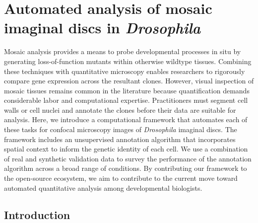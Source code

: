 
\graphicspath{ {./figures/} }


\chapter{Automated analysis of mosaic imaginal discs in \textit{Drosophila}}



Mosaic analysis provides a means to probe developmental processes in situ by generating loss-of-function mutants within otherwise wildtype tissues. Combining these techniques with quantitative microscopy enables researchers to rigorously compare gene expression across the resultant clones. However, visual inspection of mosaic tissues remains common in the literature because quantification demands considerable labor and computational expertise. Practitioners must segment cell walls or cell nuclei and annotate the clones before their data are suitable for analysis. Here, we introduce a computational framework that automates each of these tasks for confocal microscopy images of \textit{Drosophila} imaginal discs. The framework includes an unsupervised annotation algorithm that incorporates spatial context to inform the genetic identity of each cell. We use a combination of real and synthetic validation data to survey the performance of the annotation algorithm across a broad range of conditions. By contributing our framework to the open-source ecosystem, we aim to contribute to the current move toward automated quantitative analysis among developmental biologists.



\section{Introduction}

